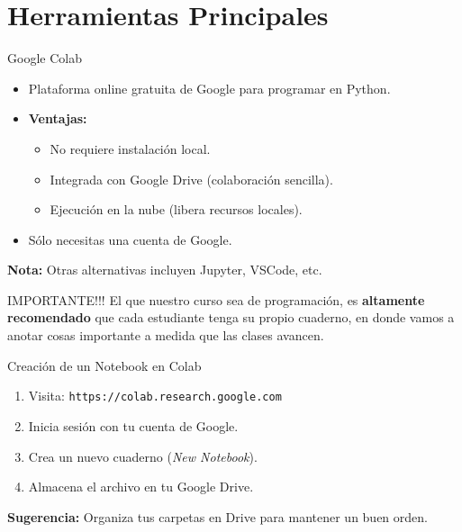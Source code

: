 \documentclass[10pt]{beamer}
\begin{document}
\section{Herramientas Principales}

\begin{frame}{Google Colab}
  \begin{itemize}
    \item Plataforma online gratuita de Google para programar en Python.
    \item \textbf{Ventajas:}
      \begin{itemize}
        \item No requiere instalación local.
        \item Integrada con Google Drive (colaboración sencilla).
        \item Ejecución en la nube (libera recursos locales).
      \end{itemize}
    \item Sólo necesitas una cuenta de Google.
  \end{itemize}
  \vspace{0.3cm}
  \textbf{Nota:} Otras alternativas incluyen Jupyter, VSCode, etc.

  \begin{block}{IMPORTANTE!!!}
    El que nuestro curso sea de programación, es \textbf{altamente recomendado} que cada estudiante tenga su propio cuaderno, en donde vamos a anotar cosas importante a medida que las clases avancen.
  \end{block}
\end{frame}

\begin{frame}{Creación de un Notebook en Colab}
  \begin{enumerate}
    \item Visita: \texttt{https://colab.research.google.com}
    \item Inicia sesión con tu cuenta de Google.
    \item Crea un nuevo cuaderno (\emph{New Notebook}).
    \item Almacena el archivo en tu Google Drive.
  \end{enumerate}
  \textbf{Sugerencia:} Organiza tus carpetas en Drive para mantener un buen orden.
\end{frame}
\end{document}
